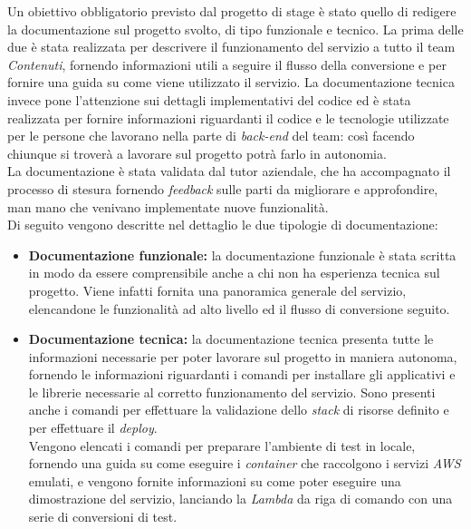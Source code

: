 Un obiettivo obbligatorio previsto dal progetto di stage è stato quello di redigere la
documentazione sul progetto svolto, di tipo funzionale e tecnico. La prima delle
due è stata realizzata per descrivere il funzionamento del servizio a tutto il
team \emph{Contenuti}, fornendo informazioni utili a seguire il flusso della
conversione e per fornire una guida su come viene utilizzato il servizio. La documentazione tecnica invece pone l'attenzione sui dettagli
implementativi del codice ed è stata realizzata per fornire informazioni
riguardanti il codice e le tecnologie utilizzate per le persone che lavorano
nella parte di \emph{back-end} del team: così facendo chiunque si troverà a
lavorare sul progetto potrà farlo in autonomia.\\
La documentazione è stata validata dal tutor aziendale, che ha accompagnato il
processo di stesura fornendo \emph{feedback} sulle parti da migliorare e
approfondire, man mano che venivano implementate nuove funzionalità. \\
Di seguito vengono descritte nel dettaglio le due tipologie di documentazione:
\begin{itemize}
    \item \textbf{Documentazione funzionale:} la documentazione funzionale è
          stata scritta in modo da essere comprensibile anche a chi non ha esperienza
          tecnica sul progetto. Viene infatti fornita una panoramica generale del
          servizio, elencandone le funzionalità ad alto livello ed il flusso di
          conversione seguito.
    \item \textbf{Documentazione tecnica:} la documentazione tecnica presenta
          tutte le informazioni necessarie per poter lavorare sul progetto in
          maniera autonoma, fornendo le informazioni riguardanti i comandi per
          installare gli applicativi e le librerie necessarie al corretto
          funzionamento del servizio. Sono presenti anche i comandi per
          effettuare la validazione dello \emph{stack} di risorse definito e per
          effettuare il \emph{deploy}. \\
          Vengono elencati i comandi per preparare l'ambiente di test in
          locale, fornendo una guida su come eseguire i \emph{container} che
          raccolgono i servizi \emph{AWS} emulati, e vengono fornite
          informazioni su come poter eseguire una dimostrazione del servizio,
          lanciando la \emph{Lambda} da riga di comando con una serie di
          conversioni di test.
\end{itemize}

